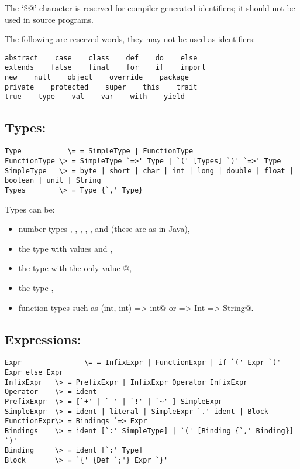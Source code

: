 \documentclass[11pt]{book}
\begin{document}
The `\verb@\$@' character is reserved for compiler-generated
identifiers; it should not be used in source programs. %

The following are reserved words, they may not be used as identifiers:
\begin{verbatim}
abstract    case    class    def    do    else   
extends    false    final    for    if    import    
new    null    object    override    package    
private    protected    super    this    trait
true    type    val    var    with    yield
\end{verbatim}

\subsection*{Types:}

\begin{verbatim}
Type           \= = SimpleType | FunctionType
FunctionType \> = SimpleType `=>' Type | `(' [Types] `)' `=>' Type
SimpleType   \> = byte | short | char | int | long | double | float | boolean | unit | String
Types        \> = Type {`,' Type}
\end{verbatim}

Types can be:
\begin{itemize}
\item number types \verb@byte@, \verb@short@, \verb@char@, \verb@int@, \verb@long@, \verb@float@ and \verb@double@ (these are as in Java),
\item the type \verb@boolean@ with values \verb@true@ and \verb@false@,
\item the type \verb@unit@ with the only value \verb@{}@,
\item the type \verb@String@,
\item function types such as \verb@(int, int) => int@ or \verb@String => Int => String@. 
\end{itemize}

\subsection*{Expressions:}

\begin{verbatim}
Expr               \= = InfixExpr | FunctionExpr | if `(' Expr `)' Expr else Expr
InfixExpr   \> = PrefixExpr | InfixExpr Operator InfixExpr
Operator    \> = ident
PrefixExpr  \> = [`+' | `-' | `!' | `~' ] SimpleExpr
SimpleExpr  \> = ident | literal | SimpleExpr `.' ident | Block
FunctionExpr\> = Bindings `=> Expr
Bindings    \> = ident [`:' SimpleType] | `(' [Binding {`,' Binding}] `)'
Binding     \> = ident [`:' Type]
Block       \> = `{' {Def `;'} Expr `}'
\end{verbatim}
\end{document}
